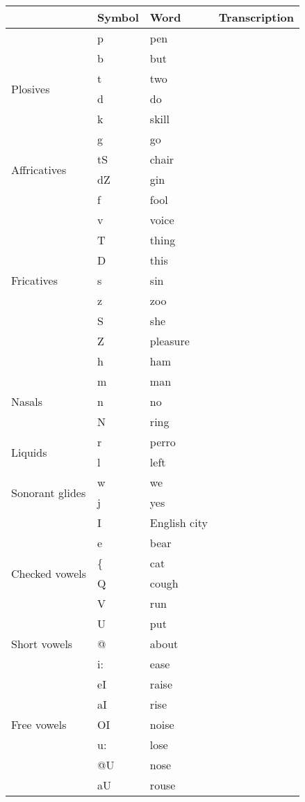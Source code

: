 \begin{longtable}{l|l|p{.3\linewidth}|l}
	& Symbol & Word & Transcription\\
	\hline
	\multirow{6}{*}{Plosives} &
	  p & pen &\\
	& b & but &\\
	& t & two &\\
	& d & do &\\
	& k & skill &\\
	& g & go &\\
	\hline
	\multirow{2}{*}{Affricatives} &
	tS & chair &\\
	& dZ & gin &\\
	\hline
	\multirow{9}{*}{Fricatives} &
		f & fool &\\
	& v & voice &\\
	& T & thing &\\
	& D & this &\\
	& s & sin &\\
	& z & zoo &\\
	& S & she &\\
	& Z & pleasure &\\
	& h & ham &\\
	\hline
	\multirow{3}{*}{Nasals} &
	m & man &\\
	& n & no &\\
	& N & ring &\\
	\hline
	\multirow{2}{*}{Liquids} &
	r & perro &\\
	& l & left &\\
	\hline
	\multirow{2}{*}{Sonorant glides} &
	w & we &\\
	& j & yes &\\
	\hline
	\multirow{6}{*}{Checked vowels} &
	I & English city &\\
	& e & bear &\\
	& \{ & cat &\\
	& Q & cough &\\
	& V & run &\\
	& U & put &\\
	\hline
	\multirow{1}{*}{Short vowels} &
	@ & about &\\
	\hline
	\multirow{13}{*}{Free vowels} &
	i: & ease &\\
	& eI & raise &\\
	& aI & rise &\\
	& OI & noise &\\
	& u: & lose &\\
	& @U & nose &\\
	& aU & rouse &\\

\end{longtable}
